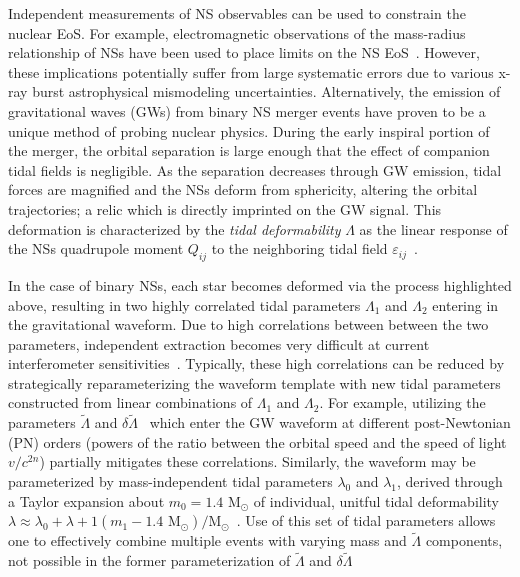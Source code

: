 \documentclass[prd,twocolumn,nofootinbib,superscriptaddress,amsmath,amssymb]{revtex4-1}
\begin{document}
Independent measurements of NS observables can be used to constrain the nuclear EoS.
For example, electromagnetic observations of the mass-radius relationship of NSs have been used to place limits on the NS EoS~\cite{guver,ozel-baym-guver,steiner-lattimer-brown,Lattimer2014,Ozel:2016oaf}.
However, these implications potentially suffer from large systematic errors due to various x-ray burst astrophysical mismodeling uncertainties.
Alternatively, the emission of gravitational waves (GWs) from binary NS merger events have proven to be a unique method of probing nuclear physics.
During the early inspiral portion of the merger, the orbital separation is large enough that the effect of companion tidal fields is negligible. 
As the separation decreases through GW emission, tidal forces are magnified and the NSs deform from sphericity, altering the orbital trajectories; a relic which is directly imprinted on the GW signal.
This deformation is characterized by the \textit{tidal deformability} $\Lambda$ as the linear response of the NSs quadrupole moment $Q_{ij}$ to the neighboring tidal field $\varepsilon_{ij}$~\cite{hinderer-love,Flanagan2008}.

In the case of binary NSs, each star becomes deformed via the process highlighted above, resulting in two highly correlated tidal parameters $\Lambda_1$ and $\Lambda_2$ entering in the gravitational waveform\cite{Flanagan2008,Vines:2011ud}.
Due to high correlations between between the two parameters, independent extraction becomes very difficult at current interferometer sensitivities~\cite{Wade:tidalCorrections}.
Typically, these high correlations can be reduced by strategically reparameterizing the waveform template with new tidal parameters constructed from linear combinations of $\Lambda_1$ and $\Lambda_2$.
For example, utilizing the parameters $\tilde{\Lambda}$ and $\delta \tilde{\Lambda}$~\cite{Favata:2013rwa,Wade:tidalCorrections} which enter the GW waveform at different post-Newtonian (PN) orders (powers of the ratio between the orbital speed and the speed of light $v/c^{2n}$) partially mitigates these correlations.
Similarly, the waveform may be parameterized by mass-independent tidal parameters $\lambda_0$ and $\lambda_1$, derived through a Taylor expansion about $m_0=1.4 \text{ M}_{\odot}$ of individual, unitful tidal deformability $\lambda \approx \lambda_0+\lambda+1(m_1-1.4 \text{ M}_{\odot})/\text{M}_{\odot}$~\cite{delPozzo:TaylorTidal}. 
Use of this set of tidal parameters allows one to effectively combine multiple events with varying mass and $\tilde\Lambda$ components, not possible in the former parameterization of $\tilde{\Lambda}$ and $\delta \tilde{\Lambda}$
\end{document}
